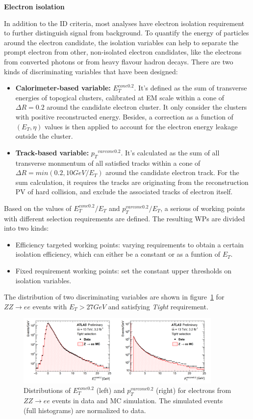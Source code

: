 \textbf{Electron isolation}

In addition to the ID criteria, most analyses have electron isolation requirement to further distinguish signal from background.
To quantify the energy of particles around the electron candidate, the isolation variables can help to separate the prompt electron from other, non-isolated electron candidates, like the electrons from converted photons or from heavy flavour hadron decays.
There are two kinds of discriminating variables that have been designed:
\begin{itemize}
	\item \textbf{Calorimeter-based variable:} $E_{T}^{cone0.2}$. It's defined as the sum of transverse energies of topogical clusters\cite{Aad:2016upy}, calibrated at EM scale within a cone of $\Delta R = 0.2$ around the candidate electron cluster. It only consider the clusters with positive reconstructed energy. Besides, a correction as a function of $(E_{T}, \eta)$ values is then applied to account for the electron energy leakage outside the cluster.
	\item \textbf{Track-based variable:} $p_T{}^{varcone0.2}$. It's calculated as the sum of all transverse monmentum of all satisfied tracks within a cone of $\Delta R = min(0.2, 10 GeV/E_{T})$ around the candidate electron track. For the sum calculation, it requires the tracks are originating from the reconstruction PV of hard collision, and exclude the associated tracks of electron itself.
\end{itemize}
Based on the values of $E_{T}^{cone0.2}/E_{T}$ and $p_{T}^{varcone0.2}/E_{T}$, a serious of working points with different selection requirements are defined.
The resulting WPs are divided into two kinds:
\begin{itemize}
	\item Efficiency targeted working points: varying requirements to obtain a certain isolation efficiency, which can either be a constant or as a funtion of $E_{T}$.
	\item Fixed requirement working points: set the constant upper thresholds on isolation variables.
\end{itemize}
The distribution of two discriminating variables are shown in figure~\ref{fig:ele_iso} for $ZZ \rightarrow ee$ events with $E_{T} > 27 GeV$ and satisfying \textit{Tight} requirement.
\begin{figure}[!htb]
  \centering
  \includegraphics[width=0.9\textwidth]{figures/Simulation/ele_iso.png}
  \caption{Distributions of $E_{T}^{cone0.2}$ (left) and $p_{T}^{varcone0.2}$ (right) for electrons from $ZZ \rightarrow ee$ events in data and MC simulation. The simulated events (full histograms) are normalized to data.}
  \label{fig:ele_iso}
\end{figure}

